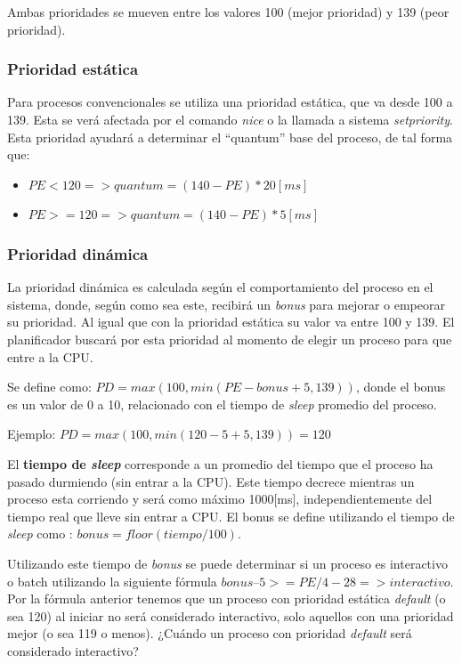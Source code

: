 Ambas prioridades se mueven entre los valores 100 (mejor prioridad) y 139 (peor
prioridad).

\subsubsection{Prioridad estática}
Para procesos convencionales se utiliza una prioridad estática, que va desde 100
a 139. Esta se verá afectada por el comando \textit{nice} o la llamada a sistema
\textit{setpriority}. Esta prioridad ayudará a determinar el ``quantum'' base
del proceso, de tal forma que:
\begin{itemize}
\item $PE < 120 => quantum = (140 - PE) * 20 [ms]$
\item $PE >= 120 => quantum = (140 - PE) * 5 [ms]$
\end{itemize}

\subsubsection{Prioridad dinámica}
La prioridad dinámica es calculada según el comportamiento del proceso en el
sistema, donde, según como sea este, recibirá un \textit{bonus} para mejorar o
empeorar su prioridad. Al igual que con la prioridad estática su valor va entre
100 y 139. El planificador buscará por esta prioridad al momento de elegir un
proceso para que entre a la CPU.

Se define como: $PD = max (100, min (PE - bonus + 5, 139))$, donde  el bonus es
un valor de 0 a 10, relacionado con el tiempo de \textit{sleep} promedio del
proceso.

Ejemplo: $PD = max (100, min (120 - 5 + 5, 139)) = 120$

El \textbf{tiempo de \textit{sleep}} corresponde a un promedio del tiempo que el
proceso ha pasado durmiendo (sin entrar a la CPU). Este tiempo decrece mientras
un proceso esta corriendo y será como máximo 1000[ms], independientemente del
tiempo real que lleve sin entrar a CPU. El bonus se define utilizando el tiempo
de \textit{sleep} como : $bonus = floor ( tiempo / 100 )$.

Utilizando este tiempo de \textit{bonus} se puede determinar si un proceso es
interactivo o batch utilizando la siguiente fórmula $bonus – 5 >= PE / 4 - 28 =>
interactivo$. Por la fórmula anterior tenemos que un proceso con prioridad
estática \textit{default} (o sea 120) al iniciar no será considerado
interactivo, solo aquellos con una prioridad mejor (o sea 119 o menos). ¿Cuándo
un proceso con prioridad \textit{default} será considerado interactivo?

